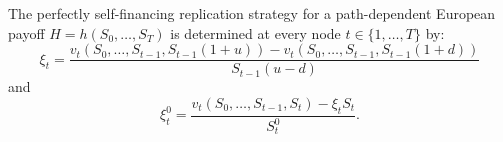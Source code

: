 \begin{proposition}
    The perfectly self-financing replication strategy for a path-dependent European payoff $H = h(S_0, \dots, S_T)$ is determined at every node $t \in \{1, \dots, T\}$ by:
    \begin{equation}
        \xi_t = \frac{v_t(S_0, \dots, S_{t-1}, S_{t-1}(1+u)) - v_t(S_0, \dots, S_{t-1}, S_{t-1}(1+d))}{S_{t-1}(u-d)} \label{eq:delta_hedging}
    \end{equation}
    and
    \begin{equation}
        \xi_t^0 = \frac{v_t(S_0, \dots, S_{t-1}, S_{t}) - \xi_t S_t}{S_t^0}. \label{eq:bank_account}
    \end{equation}
\end{proposition}

